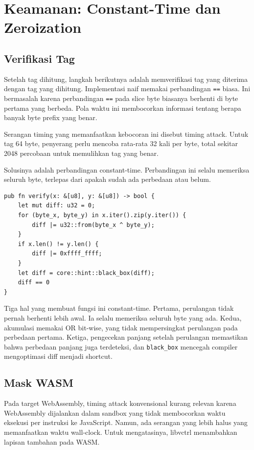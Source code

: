 \documentclass[11pt,a4paper]{article}
\begin{document}
\section{Keamanan: Constant-Time dan Zeroization}

\subsection{Verifikasi Tag}

Setelah tag dihitung, langkah berikutnya adalah memverifikasi tag yang diterima dengan tag yang dihitung. Implementasi naif memakai perbandingan \texttt{==} biasa. Ini bermasalah karena perbandingan \texttt{==} pada slice byte biasanya berhenti di byte pertama yang berbeda. Pola waktu ini membocorkan informasi tentang berapa banyak byte prefix yang benar.

Serangan timing yang memanfaatkan kebocoran ini disebut timing attack. Untuk tag 64 byte, penyerang perlu mencoba rata-rata 32 kali per byte, total sekitar 2048 percobaan untuk memulihkan tag yang benar.

Solusinya adalah perbandingan constant-time. Perbandingan ini selalu memeriksa seluruh byte, terlepas dari apakah sudah ada perbedaan atau belum.

\begin{lstlisting}[style=code]
pub fn verify(x: &[u8], y: &[u8]) -> bool {
    let mut diff: u32 = 0;
    for (byte_x, byte_y) in x.iter().zip(y.iter()) {
        diff |= u32::from(byte_x ^ byte_y);
    }
    if x.len() != y.len() {
        diff |= 0xffff_ffff;
    }
    let diff = core::hint::black_box(diff);
    diff == 0
}
\end{lstlisting}

Tiga hal yang membuat fungsi ini constant-time. Pertama, perulangan tidak pernah berhenti lebih awal. Ia selalu memeriksa seluruh byte yang ada. Kedua, akumulasi memakai OR bit-wise, yang tidak mempersingkat perulangan pada perbedaan pertama. Ketiga, pengecekan panjang setelah perulangan memastikan bahwa perbedaan panjang juga terdeteksi, dan \texttt{black\_box} mencegah compiler mengoptimasi diff menjadi shortcut.

\subsection{Mask WASM}

Pada target WebAssembly, timing attack konvensional kurang relevan karena WebAssembly dijalankan dalam sandbox yang tidak membocorkan waktu eksekusi per instruksi ke JavaScript. Namun, ada serangan yang lebih halus yang memanfaatkan waktu wall-clock. Untuk mengatasinya, libvctrl menambahkan lapisan tambahan pada WASM.
\end{document}
